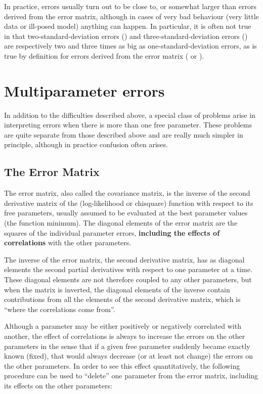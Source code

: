 In practice,  errors usually turn out to be close to, or 
somewhat larger than errors derived from the error matrix, although 
in cases of very bad behaviour (very little data or ill-posed model) 
anything can happen. In particular, it is often not
true in  that two-standard-deviation errors 
() and three-standard-deviation  errors () 
are respectively two and three times as big as one-standard-deviation errors, 
as is true by definition for errors derived from the 
error matrix ( or ).

\section{Multiparameter errors}
\label{sec:errormultipar}
 
In addition to the difficulties described above, a special class of 
problems arise in interpreting errors when there is more than one 
free parameter. These problems are quite separate from those 
described above and are really much simpler in principle, although in 
practice confusion often arises.
 
\subsection{The Error Matrix}
 
The error matrix, also called the covariance matrix, is the inverse of 
the second derivative matrix of the (log-likelihood or chisquare) 
function with respect to its free parameters, usually assumed to be 
evaluated at the best parameter values (the function minimum). The 
diagonal elements of the error matrix are the squares of the 
%
individual parameter errors, {\bf including the effects of correlations}
with the other parameters.
 
The inverse of the error matrix, the second derivative matrix, has as 
diagonal elements the second partial derivatives with respect to one 
parameter at a time. These diagonal elements are not therefore 
coupled to any other parameters, but when the matrix is inverted, 
the diagonal elements of the inverse contain contributions from all 
the elements of the second derivative matrix, which is ``where the 
correlations come from''.
 
Although a parameter may be either positively or negatively 
correlated with another, the effect of correlations is always to 
increase the errors on the other parameters in the sense that if a 
given free parameter suddenly became exactly known (fixed), that 
would always decrease (or at least not change) the errors on the 
other parameters. In order to see this effect quantitatively, the 
following procedure can be used to ``delete'' one parameter from the 
error matrix, including its effects on the other parameters:
 
